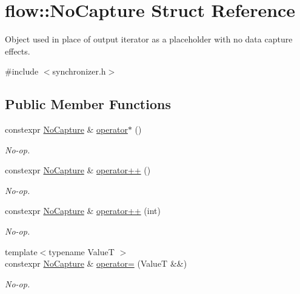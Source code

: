 \hypertarget{structflow_1_1_no_capture}{}\section{flow\+:\+:No\+Capture Struct Reference}
\label{structflow_1_1_no_capture}


Object used in place of output iterator as a placeholder with no data capture effects.  




{\ttfamily \#include $<$synchronizer.\+h$>$}

\subsection*{Public Member Functions}
\begin{DoxyCompactItemize}
\item 
\mbox{\label{structflow_1_1_no_capture_a6cdb8878087a6cb0b03d4050de2bacd2}} 
constexpr \hyperlink{structflow_1_1_no_capture}{No\+Capture} \& \hyperlink{structflow_1_1_no_capture_a6cdb8878087a6cb0b03d4050de2bacd2}{operator$\ast$} ()
\begin{DoxyCompactList}\small\item\em No-\/op. \end{DoxyCompactList}\item 
\mbox{\label{structflow_1_1_no_capture_a8810966a2d47d6ecfce33f44a89452c6}} 
constexpr \hyperlink{structflow_1_1_no_capture}{No\+Capture} \& \hyperlink{structflow_1_1_no_capture_a8810966a2d47d6ecfce33f44a89452c6}{operator++} ()
\begin{DoxyCompactList}\small\item\em No-\/op. \end{DoxyCompactList}\item 
\mbox{\label{structflow_1_1_no_capture_aeee8bd120b81f470a1452dec50faa7eb}} 
constexpr \hyperlink{structflow_1_1_no_capture}{No\+Capture} \& \hyperlink{structflow_1_1_no_capture_aeee8bd120b81f470a1452dec50faa7eb}{operator++} (int)
\begin{DoxyCompactList}\small\item\em No-\/op. \end{DoxyCompactList}\item 
\mbox{\label{structflow_1_1_no_capture_a32b6d8820ee81727c3d076b9ab14bf6c}} 
{\footnotesize template$<$typename ValueT $>$ }\\constexpr \hyperlink{structflow_1_1_no_capture}{No\+Capture} \& \hyperlink{structflow_1_1_no_capture_a32b6d8820ee81727c3d076b9ab14bf6c}{operator=} (ValueT \&\&)
\begin{DoxyCompactList}\small\item\em No-\/op. \end{DoxyCompactList}\end{DoxyCompactItemize}


